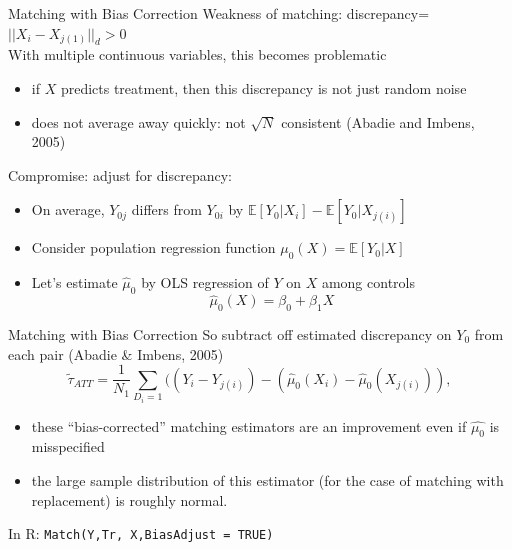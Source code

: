 \documentclass[xcolor=dvipsnames]{beamer}
\newcommand\E{\mathbb{E}}
\begin{document}

\begin{frame}{Matching with Bias Correction}
\small
{} Weakness of matching: \alert{discrepancy}=$||X_i-X_{j(1)}||_d>0$ \\
\bigskip
{} With multiple continuous variables, this becomes problematic
\begin{itemize}
\footnotesize
\item  if $X$ predicts treatment, then this discrepancy is not just random noise \\
\item<3-> does not average away quickly: not $\sqrt{N}$ consistent (Abadie and Imbens, 2005)
\end{itemize}
\small
\bigskip
{} Compromise: adjust for discrepancy:
\begin{itemize}
\item On average, $Y_{0j}$ differs from $Y_{0i}$ by $\E[Y_0|X_i]-\E[Y_0|X_{j(i)}]$
\item Consider population regression function $\mu_0(X)=\E[Y_0|X]$
\item Let's estimate $\hat{\mu}_0$ by OLS regression of $Y$ on $X$ among controls \[ \hat{\mu}_0(X)=\beta_0+\beta_1 X \] 
\end{itemize}
\end{frame}

\begin{frame}{Matching with Bias Correction}
 So subtract off estimated discrepancy on $Y_0$ from each pair (Abadie \& Imbens, 2005)
\[\tilde{\tau}_{ATT}= \frac{1}{N_1} \sum_{D_i=1}
((Y_i - Y_{j(i)}) -(\widehat\mu_0(X_i)-\widehat\mu_0(X_{j(i)})),
\] 

\begin{itemize}
\item these ``bias-corrected'' matching estimators are an improvement even if $\hat{\mu_0}$ is misspecified
\item the large sample distribution of this estimator (for the case of matching with replacement) is roughly normal. 
\end{itemize}
\bigskip
In R: \texttt{Match(Y,Tr, X,BiasAdjust = TRUE)}

\end{frame}
\end{document}
